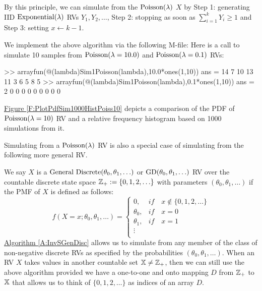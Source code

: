\begin{simulation}\label{SIM:Poisson}
By this principle, we can simulate from the $\mbox{{\rm Poisson}}(\lambda)$ $X$ by {\sf Step 1}: generating IID $\mbox{{\rm Exponential}}(\lambda)$ RVs $Y_1,Y_2,\ldots$, {\sf Step 2}: stopping as soon as $\sum_{i=1}^k Y_i \geq 1$ and {\sf Step 3:} setting $x \gets k-1$.

We implement the above algorithm via the following M-file:
Here is a call to simulate 10 samples from $\mbox{{\rm Poisson}}(\lambda=10.0)$ and $\mbox{{\rm Poisson}}(\lambda=0.1)$ RVs:
\begin{VrbM}
>> arrayfun(@(lambda)Sim1Poisson(lambda),10.0*ones(1,10)) %
ans =    14     7    10    13    11     3     6     5     8     5
>> arrayfun(@(lambda)Sim1Poisson(lambda),0.1*ones(1,10)) %
ans =     2     0     0     0     0     0     0     0     0     0
\end{VrbM}
\hyperref[F:PlotPdfSim1000HistPoiss10]{Figure \ref*{F:PlotPdfSim1000HistPoiss10}} depicts a comparison of the PDF of $\mbox{{\rm Poisson}}(\lambda=10)$ RV and a relative frequency histogram based on 1000 simulations from it.
\end{simulation}

Simulating from a $\mbox{{\rm Poisson}}(\lambda)$ RV is also a special case of simulating from the following more general RV.
\begin{model}
We say $X$ is a $\mbox{{\rm General Discrete}}(\theta_0,\theta_1,\ldots)$ or $\mbox{{\rm GD}}(\theta_0,\theta_1,\ldots)$ RV over the countable discrete state space $\mathbb{Z}_+ := \{0,1,2,\ldots\}$ with parameters $(\theta_0,\theta_1,\ldots)$ if the PMF of $X$ is defined as follows:
\[
f(X=x; \theta_0,\theta_1,\ldots) =
\begin{cases}
0, & if \quad x \notin  \{0,1,2,\ldots\} \\
 \theta_0, & if \quad x=0 \\
 \theta_1, & if \quad x=1 \\
\vdots & \\
\end{cases}
\]
\hyperref[A:InvSGenDisc]{Algorithm \ref*{A:InvSGenDisc}} allows us to simulate from any member of the class of non-negative discrete RVs as specified by the probabilities $(\theta_0,\theta_1,\ldots)$.  When an RV $X$ takes  values in another countable set $\mathbb{X} \neq \mathbb{Z}_+$, then we can still use the above algorithm provided we have a one-to-one and onto mapping $D$ from $\mathbb{Z}_+$ to $\mathbb{X}$ that allows us to think of $\{0,1,2,\ldots\}$ as indices of an array $D$.
\end{model}

